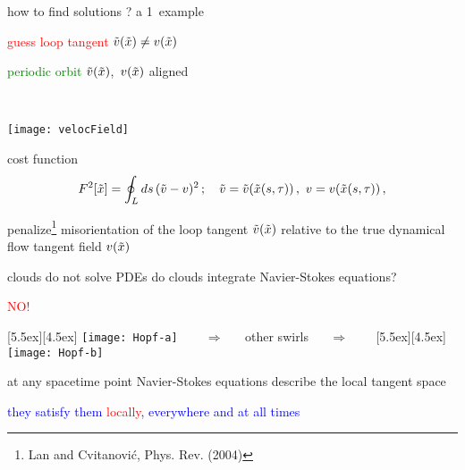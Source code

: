 \begin{frame}{how to find solutions ? \hspace{10ex}  a 1\dmn\ example}
\begin{center}
\begin{minipage}[c]{0.55\textwidth}
\textcolor{red}{guess loop tangent}
$\tilde{v}(\tilde{x})
	\neq
v(\tilde{x})$

	\vskip 0.5cm

\textcolor{green}{periodic orbit}
$\tilde{v}(\tilde{x})$,~$v(\tilde{x})$
aligned
\end{minipage}%
~~~~~~~\begin{minipage}[c]{0.40\textwidth}
	\begin{center}
	\texttt{[image: velocField]}
	\end{center}
\end{minipage}
\end{center}
\begin{block}{cost function}%
\[
F^2[\tilde{x}] =
            \oint_L ds\,(\tilde{v}-v)^2
    \,;\quad
    \tilde{v} = \tilde{v}(\tilde{x}(s,\tau))\,,\,\,
    v = v(\tilde{x}(s,\tau))
\,,
\]
\end{block}
\bigskip

penalize\footnote{ Lan and Cvitanovi\'c, Phys. Rev. (2004)}
 misorientation of the loop tangent
$\tilde{v}(\tilde{x})$
relative to the true dynamical flow tangent field $v(\tilde{x})$
\end{frame}

\begin{frame}{clouds do not solve PDEs}
do clouds integrate Navier-Stokes equations?

\begin{center}
\centerline{\textcolor{red}{\Huge NO!}}
\begin{minipage}[t]{\textwidth}
	\begin{center}
\centerline{
\raisebox{-4.0ex}[5.5ex][4.5ex]
		 {\texttt{[image: Hopf-a]}}
~~~ $\Longrightarrow$ ~~ {other swirls} ~~ $\Longrightarrow$ ~~~
	\raisebox{-4.0ex}[5.5ex][4.5ex]
		 {\texttt{[image: Hopf-b]}}
          }
	\end{center}
\end{minipage}
\end{center}

at any spacetime point Navier-Stokes equations describe the local tangent space

\bigskip
\centerline{
\textcolor{blue}{they satisfy them \textcolor{red}{\large locally}, everywhere and at all times}
}
\end{frame}

